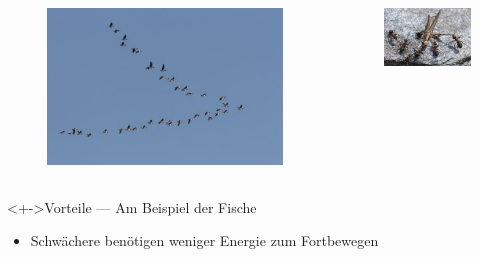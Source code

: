 \documentclass{beamer}
\def\hilite<#1>{\temporal<#1>{\color{gray}}{\color{blue!20!red!60!black}}{\color{black}}}
\begin{document}
\begin{frame}
\begin{columns}
\begin{column}{0.25\textwidth}
			\begin{figure}
				\centering
				\includegraphics[width=\textwidth]{bilder/Schwarm_Voegel.jpg}
			\end{figure}
		\end{column}
		\begin{column}{0.25\textwidth}
			\begin{figure}
				\centering
				\includegraphics[width=\textwidth]{bilder/Ameisen_jagen_Wurm.jpg}
			\end{figure}
		\end{column}
	\end{columns}
	\begin{exampleblock}<+->{Vorteile --- Am Beispiel der Fische}
		\begin{itemize}
		  \hilite<2> \item Schw\"achere ben\"otigen weniger Energie zum Fortbewegen

\end{itemize}
\end{exampleblock}
\end{frame}
\end{document}
